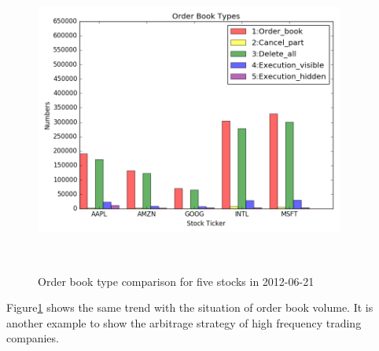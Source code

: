 \begin{figure}[hbtp]
  \begin{center}
    \includegraphics[width=4in,height=4in]{figures/order_book_type.png}
  \end{center}
\caption{Order book type comparison for five stocks in 2012-06-21} \label{fig:order_book_type}
\end{figure}
Figure\ref{fig:order_book_type} shows the same trend with the situation of order book volume. It is another example to show the arbitrage strategy of high frequency trading companies.


